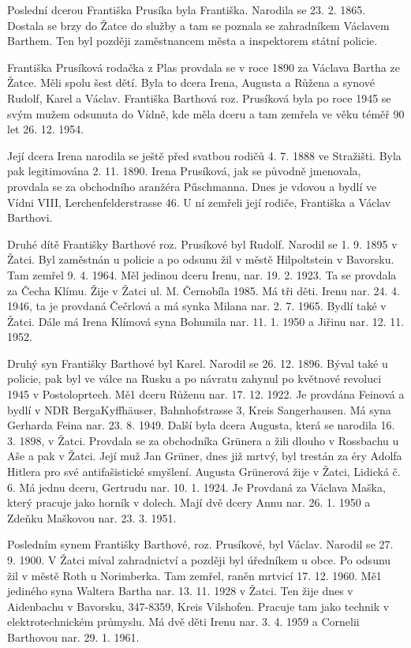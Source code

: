 \documentclass[../dejiny-rodu-prusiku.tex]{subfiles}
\begin{document}
Poslední dcerou Františka Prusíka byla Františka. Narodila se 23. 2. 1865. Dostala se brzy do Žatce do služby a tam se poznala se zahradníkem Václavem Barthem. Ten byl později zaměstnancem města a inspektorem státní policie.

Františka Prusíková rodačka z Plas provdala se v roce 1890 za Václava Bartha ze Žatce. Měli spolu šest dětí. Byla to dcera Irena, Augusta a Růžena a synové Rudolf, Karel a Václav. Františka Barthová roz. Prusíková byla po roce 1945 se svým mužem odsunuta do Vídně, kde měla dceru a tam zemřela ve věku téměř 90 let 26. 12. 1954.

Její dcera Irena narodila se ještě před svatbou rodičů 4. 7. 1888 ve Stražišti. Byla pak legitimována 2. 11. 1890. Irena Prusíková, jak se původně jmenovala, provdala se za obchodního aranžéra Pűschmanna. Dnes je vdovou a bydlí ve Vídni VIII, Lerchenfelderstrasse 46. U ní zemře­li její rodiče, Františka a Václav Barthovi.

Druhé dítě Františky Barthové roz. Prusíkové byl Rudolf. Narodil se 1. 9. 1895 v Žatci. Byl zaměstnán u policie a po odsunu žil v městě Hilpoltstein v Bavorsku. Tam zemřel 9. 4. 1964. Měl jedinou dceru Irenu, nar. 19. 2. 1923. Ta se provdala za Čecha Klímu. Žije v Žatci ul. M. Černobíla 1985. Má tři děti. Irenu nar. 24. 4. 1946, ta je provdaná Čečrlová a má synka Milana nar. 2. 7. 1965. Bydlí také v Žatci. Dále má Irena Klímová syna Bohumila nar. 11. 1. 1950 a Jiřinu nar. 12. 11. 1952.

Druhý syn Františky Barthové byl Karel. Narodil se 26. 12. 1896. Býval také u policie, pak byl ve válce na Rusku a po návratu zahynul po květnové revoluci 1945 v Postoloprtech. Mě1 dceru Růženu nar. 17. 12. 1922. Je provdána Feinová a bydlí v NDR BergaKyffhäuser, Bahnhofstrasse 3, Kreis Sangerhausen. Má syna Gerharda Feina nar. 23. 8. 1949. Další byla dcera Augusta, která se narodila 16. 3. 1898, v Žatci. Provdala se za obchodníka Grünera a žili dlouho v Rossbachu u Aše a pak v Žatci. Její muž Jan Grüner, dnes již mrtvý, byl trestán za éry Adolfa Hitlera pro své antifašistické smyšlení. Augusta Grünerová žije v Žatci, Lidická č. 6. Má jednu dceru, Gertrudu nar. 10. 1. 1924. Je Provdaná za Václava Maška, který pracuje jako horník v dolech. Mají dvě dcery Annu nar. 26. 1. 1950 a Zdeňku Maškovou nar. 23. 3. 1951.

Posledním synem Františky Barthové, roz. Prusíkové, byl Václav. Narodil se 27. 9. 1900. V Žatci míval zahradnictví a později byl úředníkem u obce. Po odsunu žil v městě Roth u Norimberka. Tam zemřel, raněn mrtvicí 17. 12. 1960. Mě1 jediného syna Waltera Bartha nar. 13. 11. 1928 v Žatci. Ten žije dnes v Aidenbachu v Bavorsku, 347-8359, Kreis Vilshofen. Pracuje tam jako technik v elektrotechnickém průmyslu. Má dvě děti Irenu nar. 3. 4. 1959 a Cornelii Barthovou nar. 29. 1. 1961.
\end{document}
